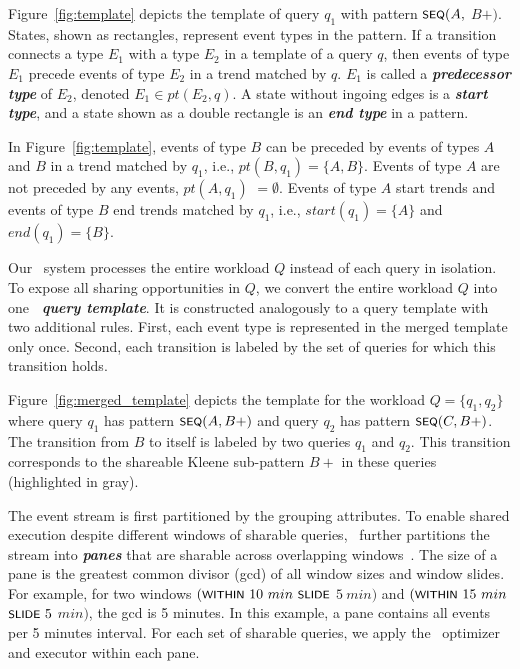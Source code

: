 Figure~\ref{fig:template} depicts the template of query $q_1$ with pattern $\textsf{\footnotesize SEQ}(A,$ $B+)$.
States, shown as rectangles, represent event types in the pattern.
If a transition connects a type $E_1$ with a type $E_2$ in a template of a query $q$, then events of type $E_1$ precede events of type $E_2$ in a trend matched by $q$. $E_1$ is called a \textit{\textbf{predecessor type}} of $E_2$, denoted $E_1 \in \textit{pt}(E_2,q)$.
A state without ingoing edges is a \textit{\textbf{start type}}, and a state shown as a double rectangle is an \textit{\textbf{end type}} in a pattern. 

\begin{example}
In Figure~\ref{fig:template}, events of type $B$ can be preceded by events of types $A$ and $B$ in a trend matched by $q_1$, i.e., $\mathit{pt}(B,q_1)=\{A,B\}$. Events of type $A$ are not preceded by any events, $\mathit{pt}(A,q_1)$ $=\emptyset$. Events of type $A$ start trends and events of type $B$ end trends matched by $q_1$, i.e., $\mathit{start}(q_1)=\{A\}$ and $\mathit{end}(q_1)=\{B\}$.
\label{ex:template_one_query}
\end{example}

Our \app\ system processes the entire workload $Q$ instead of each query in isolation. To expose all sharing opportunities in $Q$, we convert the entire workload $Q$ into one \textit{\textbf{\app\ query template}}. It is constructed analogously to a query template with two additional rules. First, each event type is represented in the merged template only once. Second, each transition is labeled by the set of queries for which this transition holds.

\begin{example}
Figure~\ref{fig:merged_template} depicts the template for the workload $Q=\{q_1,q_2\}$ where query $q_1$ has pattern $\textsf{\footnotesize SEQ}(A,B+)$ and query $q_2$ has pattern $\textsf{\footnotesize SEQ}(C,B+)$.
The transition from $B$ to itself is labeled by two queries $q_1$ and $q_2$. This transition corresponds to the shareable Kleene sub-pattern $B+$ in these queries (highlighted in gray).
\label{ex:running_example}
\end{example}

%
The event stream is first partitioned by the grouping attributes.
To enable shared execution despite different windows of sharable queries, \app\ further partitions the stream into \textbf{\textit{panes}} that are sharable across  overlapping windows~\cite{AW04, GSCL12, KWF06, LMTPT05}.
The size of a pane is the greatest common divisor (gcd) of all window sizes and window slides. For example, for two windows $(\within\ 10\ min\ \slide$ $5\ min)$ and $(\textsf{\footnotesize WITHIN}\ 15\ min$ $\textsf{\footnotesize SLIDE}\ 5$ $min)$, the gcd is 5 minutes. In this example, a pane contains all events per 5 minutes interval. For each set of sharable queries, we  apply the \app\ optimizer and executor within each pane. 









